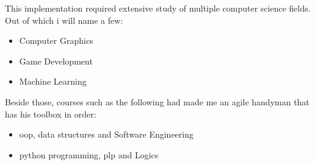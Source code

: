 










This implementation required extensive study of multiple computer science fields. 
Out of which i will name a few: 

\begin{itemize}
  \item Computer Graphics
  \item Game     Development
  \item Machine  Learning
\end{itemize}





Beside those, courses such as the following had made me an agile handyman that has his toolbox in order:
\begin{itemize}
  \item oop, data structures and Software Engineering
  \item python programming, plp and Logics
\end{itemize}




















